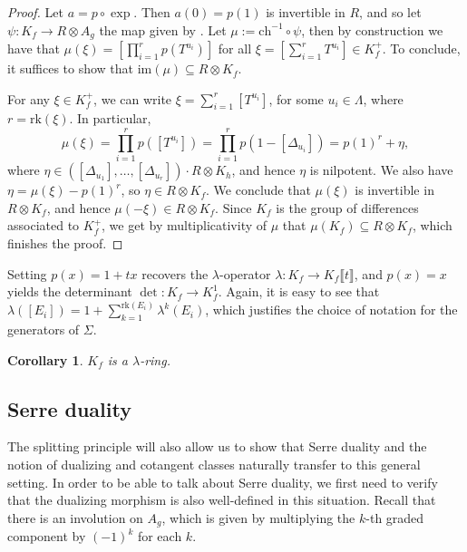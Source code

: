 \documentclass[oneside]{amsart}
\theoremstyle{plain}
\newtheorem{corollary}[theorem]{Corollary}
\theoremstyle{definition}
\newcommand{\rk}{{\mathrm{rk}}}
\newcommand{\im}{{\mathrm{im}}}
\newcommand{\ch}{{\mathrm{ch}}}
\begin{document}
\begin{proof}
    Let $a = p \circ \exp$. Then $a(0) = p(1)$ is invertible in $R$, and so let $\psi: K_f \to R \otimes A_g$ the map given by . Let $\mu := \ch^{-1} \circ \psi$, then by construction we have that $\mu(\xi) = \left[ \prod_{i = 1}^{r}p(T^{u_{i}}) \right]$ for all $\xi = \left[\sum_{i = 1}^r T^{u_i}\right] \in K_f^+$. To conclude, it suffices to show that $\im(\mu) \subseteq R \otimes K_f$.
    
    For any $\xi \in K_{f}^+$, we can write $\xi = \sum_{i = 1}^r [T^{u_i}]$, for some $u_i \in \Lambda$, where $r = \rk(\xi)$. In particular, 
    \[
        \mu(\xi) = \prod_{i = 1}^r p([T^{u_i}]) = \prod_{i = 1}^r p(1 - [\Delta_{u_i}]) = p(1)^r + \eta,
    \]
    where $\eta \in ([\Delta_{u_1}], \dots, [\Delta_{u_r}]) \cdot R \otimes K_{h}$, and hence $\eta$ is nilpotent.
    We also have $\eta = \mu(\xi) - p(1)^r$, so $\eta \in R \otimes K_{f}$. We conclude that $\mu(\xi)$ is invertible in $R \otimes K_f$, and hence $\mu(-\xi) \in R \otimes K_{f}$. Since $K_f$ is the group of differences associated to $K_f^+$,
    we get by multiplicativity of $\mu$ that $\mu(K_f) \subseteq R \otimes K_f$, which finishes the proof.
\end{proof}

Setting $p(x) = 1 + tx$ recovers the $\lambda$-operator $\lambda: K_f \to K_f\llbracket t \rrbracket$,
and $p(x) = x$ yields the determinant $\det: K_f \to K_f^1$. Again, it is easy to see that $\lambda([E_i]) = 1 + \sum_{k = 1}^{\rk(E_i)} \lambda^k(E_i)$, which justifies the choice of notation for the generators of $\Sigma$.

\begin{corollary}
    $K_f$ is a $\lambda$-ring.
\end{corollary}

\subsection{Serre duality}

The splitting principle will also allow us to show that Serre duality and the notion of dualizing and cotangent classes naturally transfer to this general setting.
In order to be able to talk about Serre duality, we first need to verify that the dualizing morphism is also well-defined in this situation. Recall that there is an involution on $A_g$, which is given by multiplying the $k$-th graded component by $(-1)^k$ for each $k$.
\end{document}
